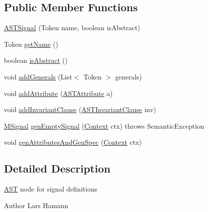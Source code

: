 \subsection*{Public Member Functions}
\begin{DoxyCompactItemize}
\item 
\hyperlink{classorg_1_1tzi_1_1use_1_1parser_1_1use_1_1statemachines_1_1_a_s_t_signal_aac6b29ccb77b097b61600ef2e2f36a59}{A\-S\-T\-Signal} (Token name, boolean is\-Abstract)
\item 
Token \hyperlink{classorg_1_1tzi_1_1use_1_1parser_1_1use_1_1statemachines_1_1_a_s_t_signal_ac2ceb8aa233b8409f87971b963816bb9}{get\-Name} ()
\item 
boolean \hyperlink{classorg_1_1tzi_1_1use_1_1parser_1_1use_1_1statemachines_1_1_a_s_t_signal_a59e90af91123e020fcdafbfcd4b2c52c}{is\-Abstract} ()
\item 
void \hyperlink{classorg_1_1tzi_1_1use_1_1parser_1_1use_1_1statemachines_1_1_a_s_t_signal_a8bebd42fb8c05bf4c8ea3c890735d250}{add\-Generals} (List$<$ Token $>$ generals)
\item 
void \hyperlink{classorg_1_1tzi_1_1use_1_1parser_1_1use_1_1statemachines_1_1_a_s_t_signal_ad69f6f52f4d87894de0c5a5c6f08e64f}{add\-Attribute} (\hyperlink{classorg_1_1tzi_1_1use_1_1parser_1_1use_1_1_a_s_t_attribute}{A\-S\-T\-Attribute} a)
\item 
void \hyperlink{classorg_1_1tzi_1_1use_1_1parser_1_1use_1_1statemachines_1_1_a_s_t_signal_a8bf8fd4d07fcd34dc0f1f2d1ed7c963f}{add\-Invariant\-Clause} (\hyperlink{classorg_1_1tzi_1_1use_1_1parser_1_1use_1_1_a_s_t_invariant_clause}{A\-S\-T\-Invariant\-Clause} inv)
\item 
\hyperlink{interfaceorg_1_1tzi_1_1use_1_1uml_1_1mm_1_1commonbehavior_1_1communications_1_1_m_signal}{M\-Signal} \hyperlink{classorg_1_1tzi_1_1use_1_1parser_1_1use_1_1statemachines_1_1_a_s_t_signal_a0145c31b18ed2923a389a564c6f7d5bd}{gen\-Empty\-Signal} (\hyperlink{classorg_1_1tzi_1_1use_1_1parser_1_1_context}{Context} ctx)  throws Semantic\-Exception 
\item 
void \hyperlink{classorg_1_1tzi_1_1use_1_1parser_1_1use_1_1statemachines_1_1_a_s_t_signal_ab72a27b8a7e61b9cd0c2e1089ddfcbc4}{gen\-Attributes\-And\-Gen\-Spec} (\hyperlink{classorg_1_1tzi_1_1use_1_1parser_1_1_context}{Context} ctx)
\end{DoxyCompactItemize}


\subsection{Detailed Description}
\hyperlink{classorg_1_1tzi_1_1use_1_1parser_1_1_a_s_t}{A\-S\-T} node for signal definitions \begin{DoxyAuthor}{Author}
Lars Hamann 
\end{DoxyAuthor}



